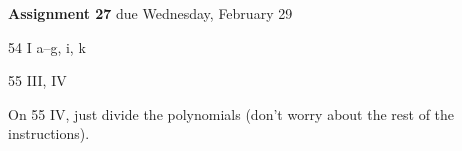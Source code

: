 \documentclass[12pt]{letter}
\begin{document}
\textbf{Assignment 27} due Wednesday, February 29

54 I a--g, i, k

55 III, IV

On 55 IV, just divide the polynomials (don't worry about the rest of the instructions).
\end{document}
